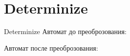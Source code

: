 \section{Determinize}
\begin{frame}{Determinize}
	Автомат до преоброзования:


	Автомат после преоброзования:


\end{frame}
